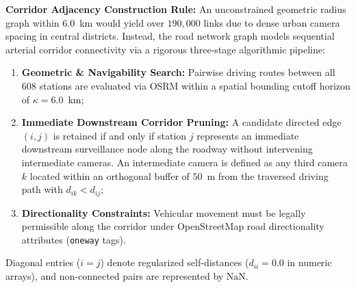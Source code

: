 \documentclass[preprint,12pt]{elsarticle}
\begin{document}
\textbf{Corridor Adjacency Construction Rule:} An unconstrained geometric radius graph within $6.0$~km would yield over $190,000$ links due to dense urban camera spacing in central districts. Instead, the road network graph models sequential arterial corridor connectivity via a rigorous three-stage algorithmic pipeline:
\begin{enumerate}
    \item \textbf{Geometric \& Navigability Search:} Pairwise driving routes between all 608 stations are evaluated via OSRM within a spatial bounding cutoff horizon of $\kappa = \mathbf{6.0}$~km;
    \item \textbf{Immediate Downstream Corridor Pruning:} A candidate directed edge $(i, j)$ is retained if and only if station $j$ represents an immediate downstream surveillance node along the roadway without intervening intermediate cameras. An intermediate camera is defined as any third camera $k$ located within an orthogonal buffer of $50$~m from the traversed driving path with $d_{ik} < d_{ij}$;
    \item \textbf{Directionality Constraints:} Vehicular movement must be legally permissible along the corridor under OpenStreetMap road directionality attributes (\texttt{oneway} tags).
\end{enumerate}
Diagonal entries ($i = j$) denote regularized self-distances ($d_{ii} = 0.0$ in numeric arrays), and non-connected pairs are represented by $\text{NaN}$.
\end{document}
